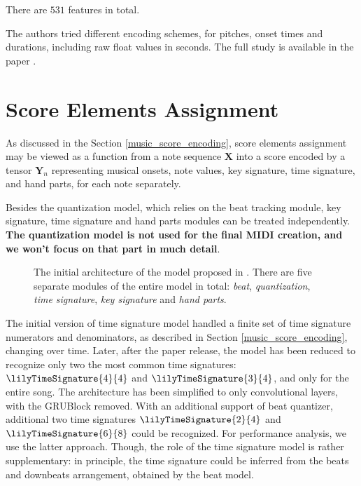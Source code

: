 There are $531$ features in total.

The authors tried different encoding schemes, for pitches, onset times and durations, including raw float values in seconds. The full study is available in the paper \cite{Liu2022}.

\section{Score Elements Assignment}

As discussed in the Section \ref{music_score_encoding}, score elements assignment may be viewed as a function from a note sequence $\mathbf{X}$ into a score encoded by a tensor $\mathbf{Y}_n$ representing musical onsets, note values, key signature, time signature, and hand parts, for each note separately.

Besides the quantization model, which relies on the beat tracking module, key signature, time signature and hand parts modules can be treated independently. \textbf{The quantization model is not used for the final MIDI creation, and we won't focus on that part in much detail}.

\begin{figure}[!ht]
\centering

\caption[The initial architecture of the model.]{The initial architecture of the model proposed in \cite{Liu2022}. There are five separate modules of the entire model in total: \emph{beat}, \emph{quantization}, \emph{time signature}, \emph{key signature} and \emph{hand parts}.}
\end{figure}

The initial version of time signature model handled a finite set of time signature numerators and denominators, as described in Section \ref{music_score_encoding}, changing over time. Later, after the paper release, the model has been reduced to recognize only two the most common time signatures: $\lilyTimeSignature{4}{4}$ and $\lilyTimeSignature{3}{4}$, and only for the entire song. The architecture has been simplified to only convolutional layers, with the GRUBlock removed. With an additional support of beat quantizer, additional two time signatures $\lilyTimeSignature{2}{4}$ and $\lilyTimeSignature{6}{8}$ could be recognized. For performance analysis, we use the latter approach. Though, the role of the time signature model is rather supplementary: in principle, the time signature could be inferred from the beats and downbeats arrangement, obtained by the beat model.

